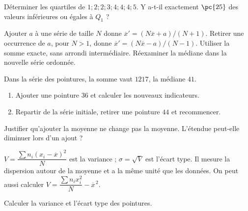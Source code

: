 \begin{example}Déterminer les quartiles de $1;2;2;3;4;4;4;5$. Y a-t-il exactement $\pc{25}$ des valeurs inférieures ou égales à $Q_1$ ?\end{example}
\begin{keypoint}[Propriétés]
Ajouter $a$ à une série de taille $N$ donne $\overline x'=(N\overline x+a)/(N+1)$.
Retirer une occurrence de $a$, pour $N>1$, donne $\overline x'=(N\overline x-a)/(N-1)$. Utiliser la somme exacte, sans arrondi intermédiaire. Réexaminer la médiane dans la nouvelle série ordonnée.
\end{keypoint}
\begin{example}Dans la série des pointures, la somme vaut $1217$, la médiane $41$.
\begin{enumerate}\item Ajouter une pointure $36$ et calculer les nouveaux indicateurs.\item Repartir de la série initiale, retirer une pointure $44$ et recommencer.\end{enumerate}\end{example}
\begin{example}Justifier qu'ajouter la moyenne ne change pas la moyenne. L'étendue peut-elle diminuer lors d'un ajout ?\end{example}
\begin{keypoint}[Définitions]
$V=\dfrac{\sum n_i(x_i-\overline x)^2}{N}$ est la variance ; $\sigma=\sqrt V$ est l'écart type. Il mesure la dispersion autour de la moyenne et a la même unité que les données. On peut aussi calculer $V=\dfrac{\sum n_ix_i^2}{N}-\overline x^{\,2}$.
\end{keypoint}
\begin{example}Calculer la variance et l'écart type des pointures.\end{example}
